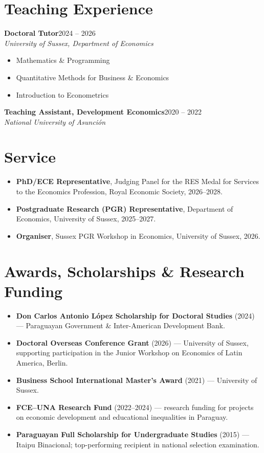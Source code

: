 \documentclass[10pt,a4paper]{article}
\newcommand{\entry}[3]{%
  \textbf{#1}\hfill{\color{muted}#2}\\
  {\small\itshape\color{muted}#3}\par\vspace{0.2ex}}
\begin{document}
\section{Teaching Experience}
\entry{Doctoral Tutor}{2024 -- 2026}{University of Sussex, Department of Economics}
\begin{itemize}
  \item Mathematics \& Programming
  \item Quantitative Methods for Business \& Economics
  \item Introduction to Econometrics
\end{itemize}
\vspace{0.3ex}
\entry{Teaching Assistant, Development Economics}{2020 -- 2022}{National University of Asunción}

\section{Service}
\begin{itemize}
  \item \textbf{PhD/ECE Representative}, Judging Panel for the RES Medal for Services to the Economics Profession, Royal Economic Society, 2026--2028.
  \item \textbf{Postgraduate Research (PGR) Representative}, Department of Economics, University of Sussex, 2025--2027.
  \item \textbf{Organiser}, Sussex PGR Workshop in Economics, University of Sussex, 2026.
\end{itemize}

\section{Awards, Scholarships \& Research Funding}
\begin{itemize}
  \item \textbf{Don Carlos Antonio López Scholarship for Doctoral Studies} (2024) --- Paraguayan Government \& Inter-American Development Bank.
  \item \textbf{Doctoral Overseas Conference Grant} (2026) --- University of Sussex, supporting participation in the Junior Workshop on Economics of Latin America, Berlin.
  \item \textbf{Business School International Master's Award} (2021) --- University of Sussex.
  \item \textbf{FCE--UNA Research Fund} (2022--2024) --- research funding for projects on economic development and educational inequalities in Paraguay.
  \item \textbf{Paraguayan Full Scholarship for Undergraduate Studies} (2015) --- Itaipu Binacional; top-performing recipient in national selection examination.
\end{itemize}
\end{document}
